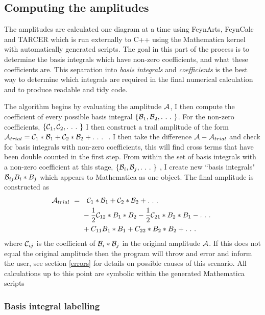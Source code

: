 \subsection{Computing the amplitudes}\label{sec:amplitudes}

The amplitudes are calculated one diagram at a time using FeynArts, FeynCalc and TARCER which is run externally to C++ using the Mathematica kernel with automatically generated scripts.  The goal in this part of the process is to determine the basis integrals which have non-zero coefficients, and what these coefficients are.  This separation into \textit{basis integrals} and \textit{coefficients} is the best way to determine which integrals are required in the final numerical calculation and to produce readable and tidy code.

The algorithm begins by evaluating the amplitude $\mathcal{A}$, I then compute the coefficient of every possible basis integral $\{\B_1,\B_2,.\ .\ .\ \}$.  For the non-zero coefficients, $\{\mathcal{C}_1,\mathcal{C}_2, .\ .\ .\  \}$ I then construct a trail amplitude of the form $\mathcal{A}_{trial} = \mathcal{C}_1 * \mathcal{B}_1 + \mathcal{C}_2 * \mathcal{B}_2 + .\ .\ .\ $ .  I then take the difference $\mathcal{A} - \mathcal{A}_{trial}$ and check for basis integrals with non-zero coefficients, this will find cross terms that have been double counted in the first step.  From within the set of basis integrals with a non-zero coefficient at this stage, $\{\mathcal{B}_i,\mathcal{B}_j,.\ .\ .\ \}$ , I create new ``basis integrals" $\mathcal{B}_{ij}  B_i*B_j$ which appears to Mathematica as one object.  The final amplitude is constructed as
\begin{align*}
 \A_{trial}\ = \ & \ \ \C_1 * \B_1 + \C_2 * \B_2 + .\ .\ .\ \\ 
  &-\frac{1}{2} \C_{12} * B_1*B_2  -\frac{1}{2} \C_{21} * B_2*B_1 - .\ .\ .\ \\
  & + C_{11} B_1*B_1 + C_{22}*B_2*B_2 + .\ .\ .\ 
\end{align*}
where $ \mathcal{C}_{ij}$ is the coefficient of  $\mathcal{B}_i*\mathcal{B}_j$ in the original amplitude $\mathcal{A}$.  If this does not equal the original amplitude then the program will throw and error and inform the user, see section \ref{errors} for details on possible causes of this scenario.  All calculations up to this point are symbolic within the generated Mathematica scripts

\subsubsection{Basis integral labelling}

